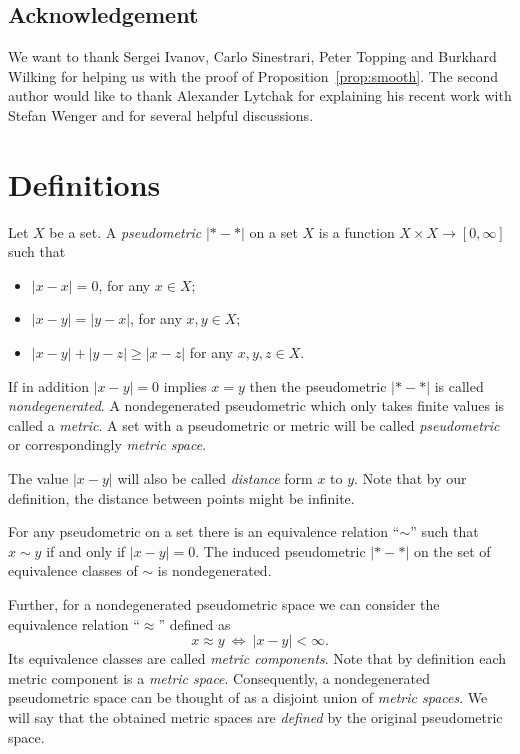\documentclass[a4paper,10pt]{amsart}
\begin{document}
\subsection{Acknowledgement}
We want to thank Sergei Ivanov, Carlo Sinestrari, Peter Topping and
Burkhard Wilking for helping us with the proof of Proposition~\ref{prop:smooth}.
The second author would like to thank Alexander Lytchak for explaining his recent work 
with Stefan Wenger and for several helpful discussions.
\medskip



\section{Definitions}\label{sec:Def}

Let $X$ be a set.
A \emph{pseudometric} $|{*}-{*}|$ on a set $X$ 
is a function $X\times X\to[0,\infty]$
such that 
\begin{itemize}
\item $|x-x|=0$, for any $x\in X$;
\item $|x-y|=|y-x|$, for any $x,y\in X$;
\item $|x-y|+|y-z|\ge|x-z|$ for any  $x,y,z\in X$.
\end{itemize}
If in addition $|x-y|=0$ implies $x=y$ then the pseudometric $|{*}-{*}|$ is called \emph{nondegenerated}.
A nondegenerated pseudometric which only takes finite values is called a \emph{metric}. A set with a pseudometric 
or metric will be called \emph{pseudometric} or correspondingly \emph{metric space}.

The value $|x-y|$ will also be called \emph{distance} form $x$ to $y$.
Note that by our definition, the distance between points might be infinite.%

For any pseudometric on a set 
there is an equivalence relation ``$\sim$''
such that $x\sim y$ if and only if $|x-y|=0$.
The induced pseudometric $|{*}-{*}|$ on the set of equivalence classes of $\sim$ is nondegenerated.

Further, for a nondegenerated pseudometric space we can consider the equivalence relation ``$\approx$'' defined as \[x\approx y\  \iff\  |x-y|<\infty.\]
Its equivalence classes are called \emph{metric components}.
Note that by definition each metric component is a \emph{metric space}.
Consequently, a nondegenerated pseudometric space 
can be thought of as a disjoint union of \emph{metric spaces}.
We will say that the obtained metric spaces are \emph{defined} by the  
original pseudometric space.%
\end{document}
